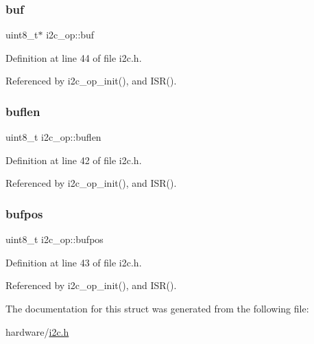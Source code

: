 \mbox{\label{structi2c__op_ad988da068bf828e0f7ccfea5e9a5b83f}} 
\subsubsection{\texorpdfstring{buf}{buf}}
{\footnotesize\ttfamily uint8\+\_\+t$\ast$ i2c\+\_\+op\+::buf}



Definition at line 44 of file i2c.\+h.



Referenced by i2c\+\_\+op\+\_\+init(), and I\+S\+R().

\mbox{\label{structi2c__op_afd970c99924335052fcc298abda4bfd5}} 
\subsubsection{\texorpdfstring{buflen}{buflen}}
{\footnotesize\ttfamily uint8\+\_\+t i2c\+\_\+op\+::buflen}



Definition at line 42 of file i2c.\+h.



Referenced by i2c\+\_\+op\+\_\+init(), and I\+S\+R().

\mbox{\label{structi2c__op_a5d137a5400fc18224e7761017f0300fa}} 
\subsubsection{\texorpdfstring{bufpos}{bufpos}}
{\footnotesize\ttfamily uint8\+\_\+t i2c\+\_\+op\+::bufpos}



Definition at line 43 of file i2c.\+h.



Referenced by i2c\+\_\+op\+\_\+init(), and I\+S\+R().



The documentation for this struct was generated from the following file\+:\begin{DoxyCompactItemize}
\item 
hardware/\hyperlink{i2c_8h}{i2c.\+h}\end{DoxyCompactItemize}
